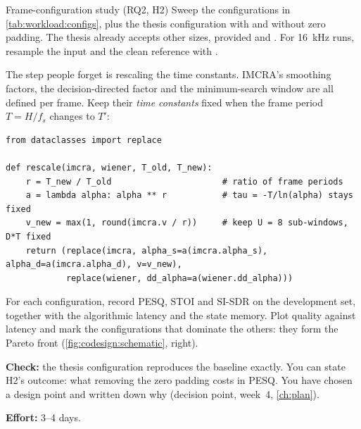 \begin{stepbox}[label=st:codesign:frames]{Frame-configuration study (RQ2, H2)}
Sweep the configurations in \cref{tab:workload:configs}, plus the thesis
configuration with and without zero padding. The thesis 
already accepts other sizes, provided  and
. For \qty{16}{\kHz} runs, resample the input and the clean
reference with .

The step people forget is rescaling the time constants. IMCRA's smoothing
factors, the decision-directed factor and the minimum-search window are all
defined per frame. Keep their \emph{time constants} fixed when the frame period
$T=H/f_s$ changes to $T'$:

\begin{lstlisting}[style=py,caption={Keeping time constants fixed across frame configurations.}]
from dataclasses import replace

def rescale(imcra, wiener, T_old, T_new):
    r = T_new / T_old                      # ratio of frame periods
    a = lambda alpha: alpha ** r           # tau = -T/ln(alpha) stays fixed
    v_new = max(1, round(imcra.v / r))     # keep U = 8 sub-windows, D*T fixed
    return (replace(imcra, alpha_s=a(imcra.alpha_s), alpha_d=a(imcra.alpha_d), v=v_new),
            replace(wiener, dd_alpha=a(wiener.dd_alpha)))
\end{lstlisting}

For each configuration, record PESQ, STOI and SI-SDR on the development set,
together with the algorithmic latency and the state memory. Plot quality against
latency and mark the configurations that dominate the others: they form the
Pareto front (\cref{fig:codesign:schematic}, right).

\textbf{Check:} the thesis configuration reproduces the baseline exactly. You
can state H2's outcome: what removing the zero padding costs in PESQ. You have
chosen a design point and written down why (decision point, week~4,
\cref{ch:plan}).

\textbf{Effort:} 3--4 days.
\end{stepbox}

